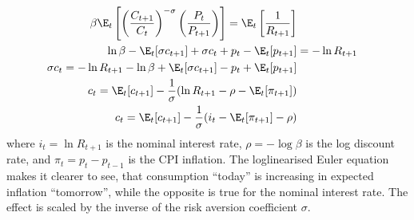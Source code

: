 \begin{align}
    \beta\E_t\left[\left(\frac{C_{t+1}}{C_{t}}\right)^{-\sigma} \left(\frac{P_{t}}{ P_{t+1}}\right)\right]                = \E_t \left[ \frac{1}{R_{t+1}} \right] \nonumber \\
    \ln\beta - \E_t[\sigma c_{t+1}] + \sigma c_t + p_t - \E_t [p_{t+1}] &= -\ln R_{t+1}                                              \nonumber  \\
    \sigma c_t  = -\ln R_{t+1} - \ln \beta + \E_t[\sigma c_{t+1}] - p_t + \E_t [p_{t+1}]                                             \nonumber \\
    c_t =  \E_t[c_{t+1}] - \frac{1}{\sigma}( \ln R_{t+1} - \rho - \E_t [\pi_{t+1}]   )                                             \nonumber \\
    c_t =  \E_t[c_{t+1}] - \frac{1}{\sigma}( i_t  - \E_t [\pi_{t+1}] - \rho  )                                                            
\end{align}
where $i_t = \ln R_{t+1}$ is the nominal interest rate, $\rho = -\log \beta$ is the log discount rate, and $\pi_t = p_t - p_{t-1}$ is the CPI inflation. The loglinearised Euler equation makes it clearer to see, that consumption ``today'' is increasing in expected inflation ``tomorrow'', while the opposite is true for the nominal interest rate. The effect is scaled by the inverse of the risk aversion coefficient $\sigma$.

